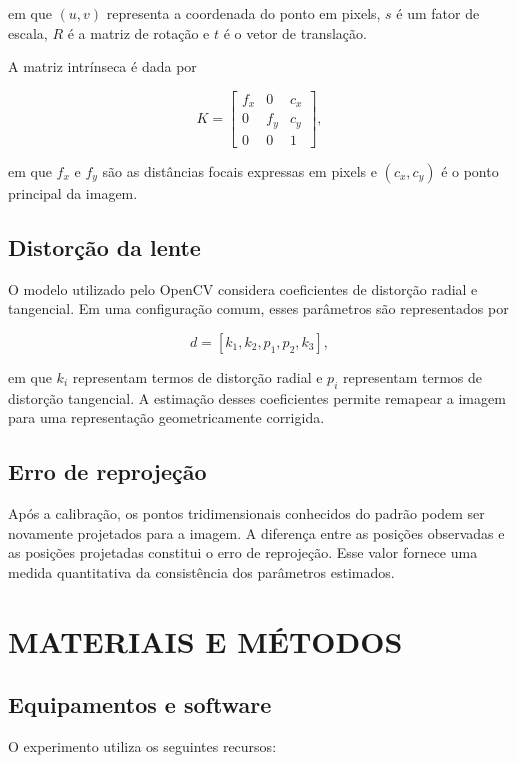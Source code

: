 \documentclass[12pt, a4paper, twoside, chapter=TITLE, subsection=TITLE, section=TITLE, subsubsection=TITLE, subsubsubsection=TITLE, english, german, brazil]{abntex2}
\begin{document}
em que $(u,v)$ representa a coordenada do ponto em pixels, $s$ é um fator de escala, $R$ é a matriz de rotação e $t$ é o vetor de translação.

A matriz intrínseca é dada por

\begin{equation}
 K =
 \begin{bmatrix}
 f_x & 0 & c_x \\
 0 & f_y & c_y \\
 0 & 0 & 1
 \end{bmatrix},
 \label{eq:K}
\end{equation}

em que $f_x$ e $f_y$ são as distâncias focais expressas em pixels e $(c_x,c_y)$ é o ponto principal da imagem.

\section{Distorção da lente}
O modelo utilizado pelo OpenCV considera coeficientes de distorção radial e tangencial. Em uma configuração comum, esses parâmetros são representados por

\begin{equation}
 d = [k_1, k_2, p_1, p_2, k_3],
\end{equation}

em que $k_i$ representam termos de distorção radial e $p_i$ representam termos de distorção tangencial. A estimação desses coeficientes permite remapear a imagem para uma representação geometricamente corrigida.

\section{Erro de reprojeção}
Após a calibração, os pontos tridimensionais conhecidos do padrão podem ser novamente projetados para a imagem. A diferença entre as posições observadas e as posições projetadas constitui o erro de reprojeção. Esse valor fornece uma medida quantitativa da consistência dos parâmetros estimados.

\chapter{MATERIAIS E MÉTODOS}
\section{Equipamentos e software}
O experimento utiliza os seguintes recursos:
\end{document}
